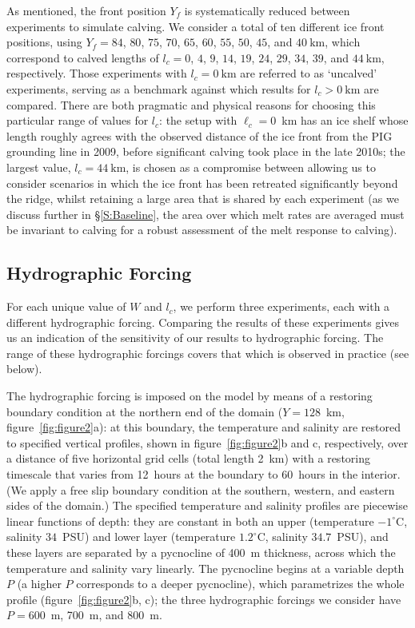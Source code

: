 \documentclass[draft]{agujournal2019}
\begin{document}
As mentioned, the front position $Y_f$ is systematically reduced between experiments to simulate calving. We consider a total of ten different ice front positions, using $Y_f=84$, $80$, $75$, $70$, $65$, $60$, $55$, $50$, $45$, and $40~\text{km}$, which correspond to calved lengths of $l_c=0$, $4$, $9$, $14$, $19$, $24$, $29$, $34$, $39$, and $44~\text{km}$, respectively. Those experiments with $l_c = 0~\text{km}$ are referred to as `uncalved' experiments, serving as a benchmark against which results for $l_c >0~\text{km}$ are compared. There are both pragmatic and physical reasons for choosing this particular range of values for $l_c$: the setup with $\ell_c = 0$~km has an ice shelf whose length roughly agrees with the observed distance of the ice front from the PIG grounding line in 2009, before significant calving took place in the late 2010s; the largest value, $l_c = 44~\text{km}$, is chosen as a compromise between allowing us to consider scenarios in which the ice front has been retreated significantly beyond the ridge, whilst retaining a large area that is shared by each experiment (as we discuss further in \S\ref{S:Baseline}, the area over which melt rates are averaged must be invariant to calving for a robust assessment of the melt response to calving).


\subsection{Hydrographic Forcing}\label{S:Experiment:Hydrography}
For each unique value of $W$ and $l_c$, we perform three experiments, each with a different hydrographic forcing. Comparing the results of these experiments gives us an indication of the sensitivity of our results to hydrographic forcing. The range of these hydrographic forcings covers that which is observed in practice (see below).

The hydrographic forcing is imposed on the model by means of a restoring boundary condition at the northern end of the domain ($Y = 128$~km, figure~\ref{fig:figure2}a): at this boundary, the temperature and salinity are restored to specified vertical profiles, shown in figure~\ref{fig:figure2}b and c, respectively, over a distance of five horizontal grid cells (total length 2 km) with a restoring timescale that varies from 12~hours at the boundary to 60~hours in the interior. (We apply a free slip boundary condition at the southern, western, and eastern sides of the domain.) The specified temperature and salinity profiles are piecewise linear functions of depth: they are constant in both an upper (temperature $-1^\circ$C, salinity $34$~PSU) and lower layer (temperature $1.2^\circ$C, salinity $34.7$~PSU), and these layers are separated by a pycnocline of 400~m thickness, across which the temperature and salinity vary linearly. The pycnocline begins at a variable depth $P$ (a higher $P$ corresponds to a deeper pycnocline), which parametrizes the whole profile (figure~\ref{fig:figure2}b, c); the three hydrographic forcings we consider have $P=600$ m, 700 m, and 800 m.
\end{document}
